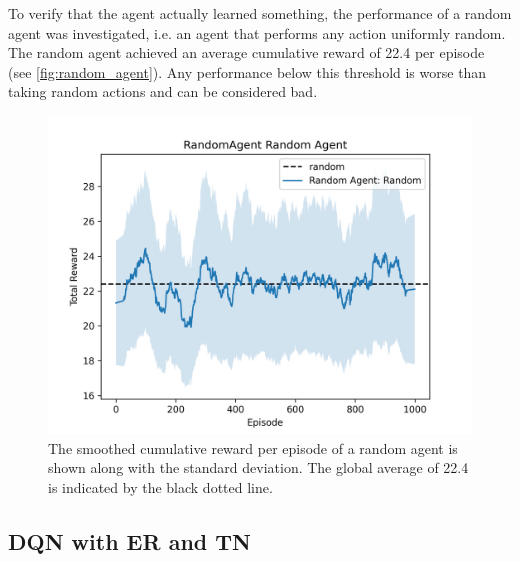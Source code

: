\documentclass{article}
\begin{document}
To verify that the agent actually learned something, 
the performance of a random agent was investigated, 
i.e. an agent that performs any action uniformly random. 
The random agent achieved an average cumulative reward of 22.4 per episode (see \autoref{fig:random_agent}).
Any performance below this threshold is worse than taking random actions 
and can be considered bad.


\begin{figure}[ht!]
   \centering
   \includegraphics[width=0.9\columnwidth]{assets/random_agent_cumulative_reward.png}
   \caption{The smoothed cumulative reward per episode of a random agent is shown 
      along with the standard deviation. The global average of 22.4 is indicated by the black dotted line.
   }
   \label{fig:random_agent}
\end{figure}

\subsection{DQN with ER and TN}
\label{subsec:dqn-with-er-and-tn}

\end{document}
